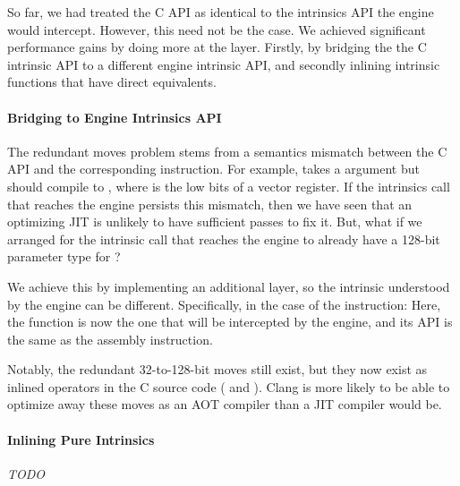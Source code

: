 So far, we had treated the C API as identical to the intrinsics API the engine
would intercept. However, this need not be the case. We achieved significant
performance gains by doing more at the  layer. Firstly, by
bridging the the C intrinsic API to a different engine intrinsic API, and
secondly inlining intrinsic functions that have direct \wasm equivalents.

\paragraph{Bridging to Engine Intrinsics API}
The redundant moves problem stems from a semantics mismatch between the C API
and the corresponding instruction.  For example,  takes a
 argument but should compile to ,
where  is the low bits of a vector register. If the intrinsics call
that reaches the \wasm engine persists this mismatch, then we have seen that an
optimizing JIT is unlikely to have sufficient passes to fix it. But, what if we
arranged for the intrinsic call that reaches the engine to already have a
128-bit parameter type for ?

We achieve this by implementing an additional layer, so the intrinsic understood
by the engine can be different. Specifically, in the case of the 
instruction:
%
%
Here, the  function is now the one that will be
intercepted by the engine, and its API is the same as the assembly instruction.

Notably, the redundant 32-to-128-bit moves still exist, but they now exist as
inlined \wasm operators in the C source code ( and
). Clang is more likely to be able to optimize away
these moves as an AOT compiler than a JIT compiler would be.

\paragraph{Inlining Pure \wasm Intrinsics}
\emph{TODO}
